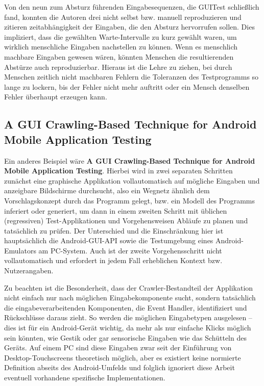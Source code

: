 Von den neun zum Absturz führenden Eingabesequenzen, die GUITest schließlich fand,
konnten die Autoren drei nicht selbst bzw. manuell reproduzieren und zitieren zeitabhängigkeit
der Eingaben, die den Absturz hervorrufen sollen. Dies impliziert, dass die gewählten Warte-Intervalle
zu kurz gewählt waren, um wirklich menschliche Eingaben nachstellen zu können. Wenn es
menschlich machbare Eingaben gewesen wären, 
könnten Menschen die resultierenden Abstürze auch reproduzierbar.
Hieraus ist die Lehre zu ziehen, bei durch Menschen zeitlich nicht machbaren Fehlern die Toleranzen
des Testprogramms so lange zu lockern, bis der Fehler nicht mehr auftritt oder ein Mensch
denselben Fehler überhaupt erzeugen kann.


\subsection{A GUI Crawling-Based Technique for Android Mobile Application Testing}

Ein anderes Beispiel wäre \textbf{\glqq{}A GUI Crawling-Based Technique for Android Mobile Application
Testing\grqq{}}\cite{AGCBTFAMAT}. Hierbei wird in zwei separaten Schritten zunächst eine graphische Applikation
vollautomatisch auf mögliche Eingaben und anzeigbare Bildschirme durchsucht, also ein
\glqq{}Wegnetz\grqq{} ähnlich dem Vorschlagskonzept durch das Programm gelegt, bzw.
ein Modell des Programms inferiert oder generiert, um dann in einem zweiten
Schritt mit üblichen (regressiven) Test-Applikationen und Vorgehensweisen Abläufe zu
planen und tatsächlich zu prüfen. Der Unterschied und die Einschränkung hier ist
hauptsächlich die Android-GUI-API sowie die Testumgebung eines Android-Emulators am
PC-System. Auch ist der zweite Vorgehensschritt nicht vollautomatisch und erfordert in jedem Fall
erheblichen Kontext bzw. Nutzerangaben.

Zu beachten ist die Besonderheit, dass der Crawler-Bestandteil der Applikation nicht
einfach nur nach möglichen Eingabekomponente sucht, sondern tatsächlich die
eingabeverarbeitenden Komponenten, die \glqq{}Event Handler\grqq{}, identifiziert
und Rückschlüsse daraus zieht. So werden die möglichen Eingabetypen ausgelesen --
dies ist für ein Android-Gerät wichtig, da mehr als nur einfache \glqq{}Klicks\grqq{}
möglich sein könnten, wie Gestik oder gar sensorische Eingaben wie das Schütteln
des Geräts. Auf einem PC sind diese Eingaben zwar seit der Einführung von
Desktop-Touchscreens theoretisch möglich, aber es existiert keine normierte
Definition abseits des Android-Umfelds und folglich ignoriert diese Arbeit
eventuell vorhandene spezifische Implementationen.

